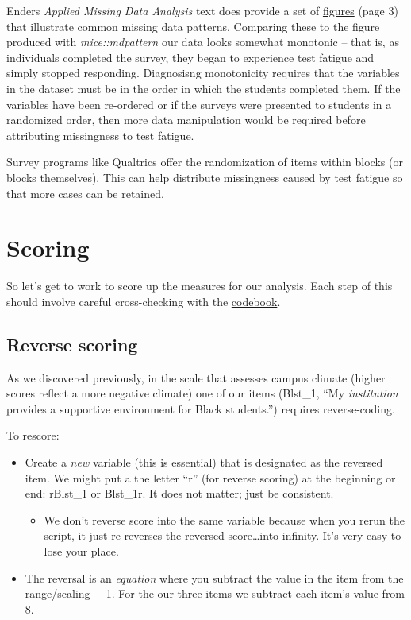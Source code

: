 \documentclass[
  11pt,
]{book}
\providecommand{\tightlist}{%
  \setlength{\itemsep}{0pt}\setlength{\parskip}{0pt}}
\begin{document}
Enders \citeyearpar{enders_applied_2010} \emph{Applied Missing Data Analysis} text does provide a set of \href{https://www.google.com/books/edition/Applied_Missing_Data_Analysis/uHt4EAAAQBAJ?hl=en\&gbpv=1\&dq=enders+missing+data\&pg=PP1\&printsec=frontcover}{figures} (page 3) that illustrate common missing data patterns. Comparing these to the figure produced with \emph{mice::mdpattern} our data looks somewhat monotonic -- that is, as individuals completed the survey, they began to experience test fatigue and simply stopped responding. Diagnosisng monotonicity requires that the variables in the dataset must be in the order in which the students completed them. If the variables have been re-ordered or if the surveys were presented to students in a randomized order, then more data manipulation would be required before attributing missingness to test fatigue.

Survey programs like Qualtrics offer the randomization of items within blocks (or blocks themselves). This can help distribute missingness caused by test fatigue so that more cases can be retained.

\hypertarget{scoring}{%
\section{Scoring}\label{scoring}}

So let's get to work to score up the measures for our analysis. Each step of this should involve careful cross-checking with the \href{https://github.com/lhbikos/ReC_MultivModel/blob/main/Rate_a_Course_Codebook.pdf}{codebook}.

\hypertarget{reverse-scoring}{%
\subsection{Reverse scoring}\label{reverse-scoring}}

As we discovered previously, in the scale that assesses campus climate (higher scores reflect a more negative climate) one of our items (Blst\_1, ``My \emph{institution} provides a supportive environment for Black students.'') requires reverse-coding.

To rescore:

\begin{itemize}
\tightlist
\item
  Create a \emph{new} variable (this is essential) that is designated as the reversed item. We might put a the letter ``r'' (for reverse scoring) at the beginning or end: rBlst\_1 or Blst\_1r. It does not matter; just be consistent.

  \begin{itemize}
  \tightlist
  \item
    We don't reverse score into the same variable because when you rerun the script, it just re-reverses the reversed score\ldots into infinity. It's very easy to lose your place.
  \end{itemize}
\item
  The reversal is an \emph{equation} where you subtract the value in the item from the range/scaling + 1. For the our three items we subtract each item's value from 8.
\end{itemize}
\end{document}
